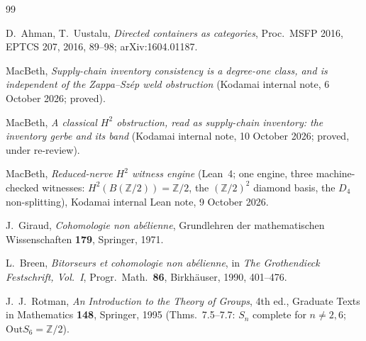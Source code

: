 \documentclass[11pt]{article}
\theoremstyle{definition}
\newcommand{\Z}{\mathbb{Z}}
\newcommand{\Out}{\mathrm{Out}}
\begin{document}
\begin{thebibliography}{99}

D.~Ahman, T.~Uustalu,
\emph{Directed containers as categories},
Proc.\ MSFP 2016, EPTCS 207, 2016, 89--98; arXiv:1604.01187.

MacBeth,
\emph{Supply-chain inventory consistency is a degree-one class, and is independent of the
Zappa--Sz\'ep weld obstruction}
(Kodamai internal note, 6 October 2026; proved).

MacBeth,
\emph{A classical $H^2$ obstruction, read as supply-chain inventory: the inventory gerbe and its band}
(Kodamai internal note, 10 October 2026; proved, under re-review).

MacBeth,
\emph{Reduced-nerve $H^2$ witness engine} (Lean~4; one engine, three machine-checked witnesses:
$H^2(B(\Z/2))=\Z/2$, the $(\Z/2)^2$ diamond basis, the $D_4$ non-splitting),
Kodamai internal Lean note, 9 October 2026.

J.~Giraud,
\emph{Cohomologie non ab\'elienne},
Grundlehren der mathematischen Wissenschaften \textbf{179}, Springer, 1971.

L.~Breen,
\emph{Bitorseurs et cohomologie non ab\'elienne},
in \emph{The Grothendieck Festschrift, Vol.\ I}, Progr.\ Math.\ \textbf{86}, Birkh\"auser, 1990,
401--476.

J.~J.~Rotman,
\emph{An Introduction to the Theory of Groups}, 4th ed.,
Graduate Texts in Mathematics \textbf{148}, Springer, 1995 (Thms.\ 7.5--7.7: $S_n$ complete for
$n\neq2,6$; $\Out S_6=\Z/2$).

\end{thebibliography}
\end{document}
